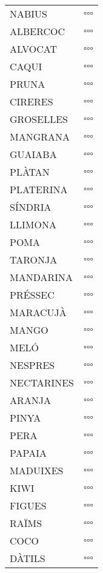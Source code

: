\documentclass[landscape,a0paper,fontscale=0.285]{baposter} %
\begin{document}
\begin{poster}
{\begin{tabular}{p{}p{}}
NABIUS & $\square\square\square$ \\
ALBERCOC & $\square\square\square$ \\
ALVOCAT & $\square\square\square$ \\
CAQUI & $\square\square\square$ \\
PRUNA & $\square\square\square$ \\
CIRERES & $\square\square\square$ \\
GROSELLES & $\square\square\square$ \\
MANGRANA & $\square\square\square$ \\
GUAIABA & $\square\square\square$ \\
PLÀTAN & $\square\square\square$ \\
PLATERINA & $\square\square\square$ \\
SÍNDRIA & $\square\square\square$ \\
LLIMONA & $\square\square\square$ \\
POMA & $\square\square\square$ \\
TARONJA & $\square\square\square$ \\
MANDARINA & $\square\square\square$ \\
PRÉSSEC & $\square\square\square$ \\
MARACUJÀ & $\square\square\square$ \\
MANGO & $\square\square\square$ \\
MELÓ & $\square\square\square$ \\
NESPRES & $\square\square\square$ \\
NECTARINES & $\square\square\square$ \\
ARANJA & $\square\square\square$ \\
PINYA & $\square\square\square$ \\
PERA & $\square\square\square$ \\
PAPAIA & $\square\square\square$ \\
MADUIXES & $\square\square\square$ \\
KIWI & $\square\square\square$ \\
FIGUES & $\square\square\square$ \\
RAÏMS & $\square\square\square$ \\
COCO & $\square\square\square$ \\
DÀTILS & $\square\square\square$ \\
\end{tabular}

}
\end{poster}
\end{document}
